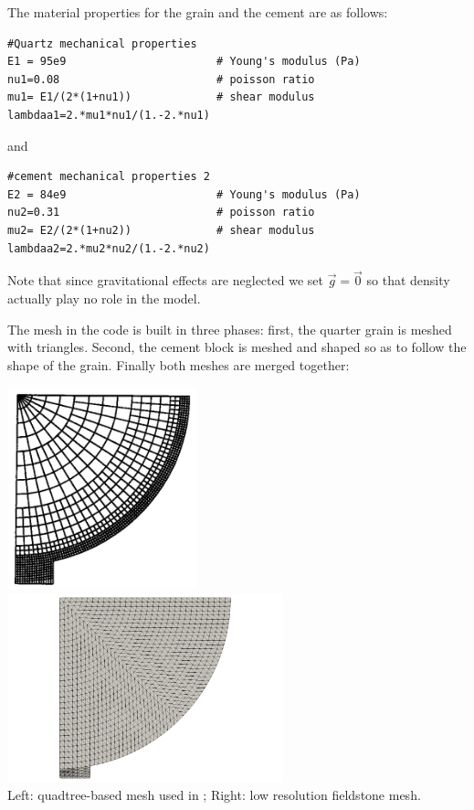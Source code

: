 The material properties for the grain and the cement are as follows:

\begin{lstlisting}
#Quartz mechanical properties
E1 = 95e9                       # Young's modulus (Pa)
nu1=0.08                        # poisson ratio
mu1= E1/(2*(1+nu1))             # shear modulus
lambdaa1=2.*mu1*nu1/(1.-2.*nu1)  
\end{lstlisting}
and
\begin{lstlisting}
#cement mechanical properties 2 
E2 = 84e9                       # Young's modulus (Pa)
nu2=0.31                        # poisson ratio
mu2= E2/(2*(1+nu2))             # shear modulus
lambdaa2=2.*mu2*nu2/(1.-2.*nu2)  
\end{lstlisting}

Note that since gravitational effects are neglected we set $\vec{g}=\vec{0}$
so that density actually play no role in the model.

The mesh in the code is built in three phases: first, the quarter grain is meshed 
with triangles. Second, the cement block is meshed and shaped so as to follow the 
shape of the grain. Finally both meshes are merged together:

\begin{center}
\includegraphics[width=5.5cm]{python_codes/fieldstone_63/images/wowu95b}
\includegraphics[width=8cm]{python_codes/fieldstone_63/images/mesh}\\
{\captionfont Left: quadtree-based mesh used in \cite{wowu95}; 
Right: low resolution fieldstone mesh.}
\end{center}

